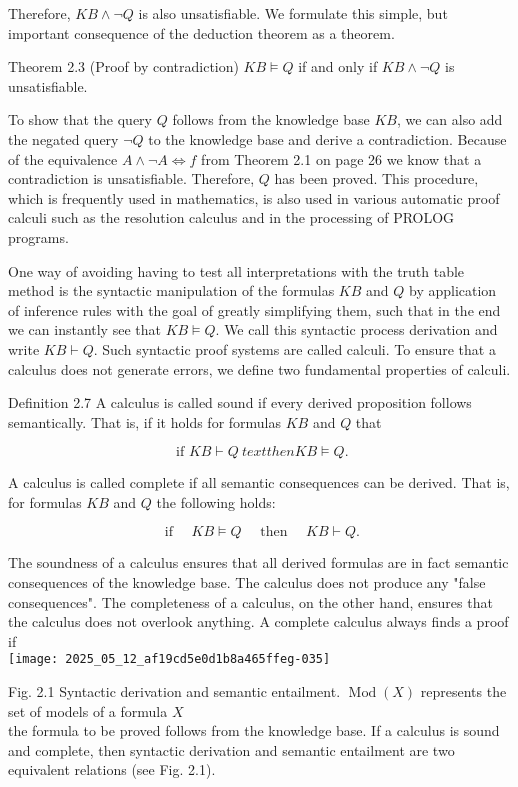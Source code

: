 \documentclass[10pt]{article}
\begin{document}
Therefore, $K B \wedge \neg Q$ is also unsatisfiable. We formulate this simple, but important consequence of the deduction theorem as a theorem.

Theorem 2.3 (Proof by contradiction) $K B \models Q$ if and only if $K B \wedge \neg Q$ is unsatisfiable.

To show that the query $Q$ follows from the knowledge base $K B$, we can also add the negated query $\neg Q$ to the knowledge base and derive a contradiction. Because of the equivalence $A \wedge \neg A \Leftrightarrow f$ from Theorem 2.1 on page 26 we know that a contradiction is unsatisfiable. Therefore, $Q$ has been proved. This procedure, which is frequently used in mathematics, is also used in various automatic proof calculi such as the resolution calculus and in the processing of PROLOG programs.

One way of avoiding having to test all interpretations with the truth table method is the syntactic manipulation of the formulas $K B$ and $Q$ by application of inference rules with the goal of greatly simplifying them, such that in the end we can instantly see that $K B \models Q$. We call this syntactic process derivation and write $K B \vdash Q$. Such syntactic proof systems are called calculi. To ensure that a calculus does not generate errors, we define two fundamental properties of calculi.

Definition 2.7 A calculus is called sound if every derived proposition follows semantically. That is, if it holds for formulas $K B$ and $Q$ that

$$
\text { if } K B \vdash Q \
text { then } K B \models Q .
$$

A calculus is called complete if all semantic consequences can be derived. That is, for formulas $K B$ and $Q$ the following holds:

$$
\text { if } \quad K B \models Q \quad \text { then } \quad K B \vdash Q .
$$

The soundness of a calculus ensures that all derived formulas are in fact semantic consequences of the knowledge base. The calculus does not produce any "false consequences". The completeness of a calculus, on the other hand, ensures that the calculus does not overlook anything. A complete calculus always finds a proof if\\
\texttt{[image: 2025\_05\_12\_af19cd5e0d1b8a465ffeg-035]}

Fig. 2.1 Syntactic derivation and semantic entailment. $\operatorname{Mod}(X)$ represents the set of models of a formula $X$\\
the formula to be proved follows from the knowledge base. If a calculus is sound and complete, then syntactic derivation and semantic entailment are two equivalent relations (see Fig. 2.1).
\end{document}
